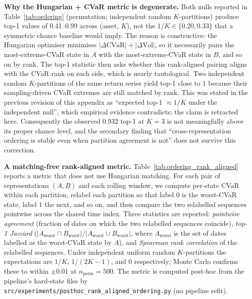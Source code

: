 \documentclass[preprint,12pt,authoryear]{elsarticle}
\begin{document}
\textbf{Why the Hungarian + CVaR metric is degenerate.}\enspace
Both nulls reported in Table~\ref{tab:ordering} (permutation; independent random $K$-partitions) produce top-1 values of 0.41--0.99 across (asset, $K$), not the $1/K \in \{0.20, 0.33\}$ that a symmetric chance baseline would imply. The reason is constructive: the Hungarian optimiser minimises $|\Delta\mathrm{CVaR}|+|\Delta\mathrm{Vol}|$, so it necessarily pairs the most-extreme-CVaR state in $A$ with the most-extreme-CVaR state in $B$, and so on by rank. The top-1 statistic then asks whether this rank-aligned pairing aligns with the CVaR rank on each side, which is nearly tautological. Two independent random $K$-partitions of the same return series yield top-1 close to $1$ because their sampling-driven CVaR extremes are still matched by rank. This was stated in the previous revision of this appendix as ``expected top-1 $\approx 1/K$ under the independent null'', which empirical evidence contradicts; the claim is retracted here. Consequently the observed $0.932$ top-1 at $K=3$ is not meaningfully above its proper chance level, and the secondary finding that ``cross-representation ordering is stable even when partition agreement is not'' does not survive this correction.

\textbf{A matching-free rank-aligned metric.}\enspace
Table~\ref{tab:ordering_rank_aligned} reports a metric that does not use Hungarian matching. For each pair of representations $(A, B)$ and each rolling window, we compute per-state CVaR within each partition, relabel each partition so that label $0$ is the worst-CVaR state, label $1$ the next, and so on, and then compare the two relabelled sequences pointwise across the shared time index. Three statistics are reported: \emph{pointwise agreement} (fraction of dates on which the two relabelled sequences coincide), \emph{top-1 Jaccard} ($|A_\text{worst} \cap B_\text{worst}| / |A_\text{worst} \cup B_\text{worst}|$, where $A_\text{worst}$ is the set of dates labelled as the worst-CVaR state by $A$), and \emph{Spearman rank correlation} of the relabelled sequences. Under independent uniform random $K$-partitions the expectations are $1/K$, $1/(2K-1)$, and $0$ respectively; Monte Carlo confirms these to within $\pm 0.01$ at $n_\text{perm}=500$. The metric is computed post-hoc from the pipeline's hard-state files by \texttt{src/experiments/posthoc\_rank\_aligned\_ordering.py} (no pipeline refit).
\end{document}

